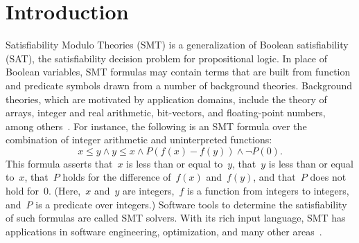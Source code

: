 \documentclass[dvipsnames,table,twoside,11pt]{article}
\begin{document}


\section{Introduction}
\label{sec:introduction}

Satisfiability Modulo Theories (SMT) is a generalization of Boolean
satisfiability (SAT), the satisfiability decision problem for
propositional logic.  In place of Boolean variables, SMT formulas may
contain terms that are built from function and predicate symbols drawn
from a number of background theories.  Background theories, which are
motivated by application domains, include the theory of arrays,
integer and real arithmetic, bit-vectors, and floating-point numbers,
among others~\cite{BarFT-RR-17}.  For instance, the following is an
SMT formula over the combination of integer arithmetic and
uninterpreted functions:
%
$$x \leq y \wedge y \leq x \wedge P (f(x) - f(y)) \wedge \neg P(0).$$
%
This formula asserts that~$x$ is less than or equal to~$y$, that~$y$
is less than or equal to~$x$, that~$P$ holds for the difference
of~$f(x)$ and~$f(y)$, and that~$P$ does not hold for~$0$.  (Here,~$x$
and~$y$ are integers,~$f$ is a function from integers to integers,
and~$P$ is a predicate over integers.)
%
Software tools to determine the satisfiability of such formulas are
called SMT solvers.  With its rich input language, SMT has
applications in software engineering, optimization, and many other
areas~\cite{DeMoura:2011:SMT}.
\end{document}
